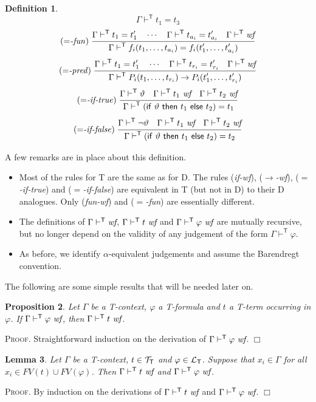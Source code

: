 \documentclass{article}
\newtheorem{definition}{Definition}[section]
\newtheorem{lemma}[definition]{Lemma}
\newtheorem{proposition}[definition]{Proposition}
\newenvironment{proof}{\smallskip\textsc{Proof.}}{\hspace*{\fill}$\Box$}
\newcommand{\D}{\textsf D}
\newcommand{\T}{\textsf T}
\newcommand{\ifthelse}[3]{\ensuremath{\mathsf{if}\ {#1}\ \mathsf{then}\ {#2}\ \mathsf{else}\ {#3}}}
\newcommand{\ok}{\mbox{\em wf}}
\newcommand{\wf}{\ \mbox{\em wf}}
\newcommand{\lang}[1]{\ensuremath{{\cal L}_{\mathsf{#1}}}}
\newcommand{\terms}[1]{\ensuremath{{\cal T}_{\mathsf{#1}}}}
\newcommand{\myvdash}[1]{\ensuremath{\vdash^{\mathsf{#1}}}}
\def\namerule#1{({\it #1\/})}
\def\rulexn#1#2#3{\makebox[0pt][r]{\hss\namerule{#1}$\;\;$}\frac{\displaystyle\strut #2}{\displaystyle\strut #3}}
\def\rulexn#1#2#3{\mbox{\namerule{#1}}\;\frac{\displaystyle\strut #2}{\displaystyle\strut #3}}
\begin{document}
\begin{definition}
$$              {\Gamma\myvdash{T}t_1=t_3}$$
$$\rulexn{$=$-fun}
   {\Gamma\myvdash{T}t_1=t'_1\quad\cdots\quad\Gamma\myvdash{T}t_{a_i}=t'_{a_i}
                             \quad \Gamma\myvdash{T}\ok}
   {\Gamma\myvdash{T}f_i(t_1,\ldots, t_{a_i})=f_i(t'_1,\ldots, t'_{a_i})}$$
$$\rulexn{$=$-pred}
   {\Gamma\myvdash{T}t_1=t'_1\quad\cdots\quad\Gamma\myvdash{T}t_{r_i}=t'_{r_i}
                             \quad \Gamma\myvdash{T}\ok}
   {\Gamma\myvdash{T}P_i(t_1,\ldots, t_{r_i}) \to P_i(t'_1,\ldots, t'_{r_i})}$$
$$\rulexn{$=$-if-true}
   {\Gamma\myvdash{T}\vartheta \quad \Gamma\myvdash{T}t_1\wf
                          \quad \Gamma\myvdash{T}t_2\wf}
   {\Gamma\myvdash{T}(\ifthelse\vartheta{t_1}{t_2})=t_1}$$
$$\rulexn{$=$-if-false}
   {\Gamma\myvdash{T}\neg\vartheta \quad \Gamma\myvdash{T}t_1\wf
                              \quad \Gamma\myvdash{T}t_2\wf}
   {\Gamma\myvdash{T}(\ifthelse\vartheta{t_1}{t_2})=t_2}$$
\end{definition}

\bigskip\noindent
A few remarks are in place about this definition.
\begin{itemize}
\item Most of the rules for {\T} are the same as for {\D}.  The rules
(\emph{if-wf}), (\emph{$\to$-wf}), (\emph{$=$-if-true}) and
(\emph{$=$-if-false}) are equivalent in {\T} (but not in {\D}) to their
{\D} analogues.  Only (\emph{fun-wf}) and (\emph{$=$-fun}) are essentially
different.
\item The definitions of $\Gamma\myvdash{T}\ok$, $\Gamma\myvdash{T}t\wf$
and $\Gamma\myvdash{T}\varphi\wf$ are mutually recursive, but no longer
depend on the validity of any judgement of the form
$\Gamma\myvdash{T}\varphi$.
\item As before, we identify $\alpha$-equivalent judgements and assume
the Barendregt convention.
\end{itemize}

The following are some simple results that will be needed later on.
\begin{proposition}\label{formwfimptermwfT}
Let $\Gamma$ be a {\T}-context,
$\varphi$ a {\T}-formula and $t$ a {\T}-term occurring in $\varphi$.
If $\Gamma\myvdash{T}\varphi\wf$, then $\Gamma\myvdash{T}t\wf$.
\end{proposition}
\begin{proof}
Straightforward induction on the derivation of 
$\Gamma\myvdash{T}\varphi\wf$.
\end{proof}

\begin{lemma}\label{Twf} Let $\Gamma$ be a {\T}-context,
$t\in\terms{T}$ and $\varphi\in\lang{T}$.  Suppose that $x_i\in\Gamma$
for all $x_i\in FV(t)\cup FV(\varphi)$.  Then $\Gamma\myvdash{T} t\wf$
and $\Gamma\myvdash{T}\varphi\wf$.
\end{lemma}
\begin{proof}
By induction on the derivations of
$\Gamma\myvdash{T}t \wf$ and $\Gamma\myvdash{T}\varphi\wf$.
\end{proof}
\end{document}
